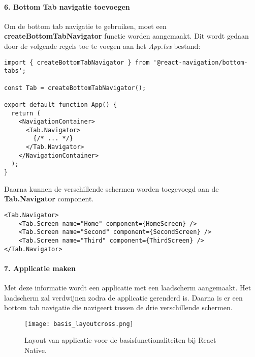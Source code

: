 \paragraph{6. Bottom Tab navigatie toevoegen}
Om de bottom tab navigatie te gebruiken, moet een \textbf{createBottomTabNavigator}
functie worden aangemaakt. Dit wordt gedaan door de volgende regels toe te voegen aan het \textit{App.tsx} bestand:
\begin{verbatim}
import { createBottomTabNavigator } from '@react-navigation/bottom-tabs';

const Tab = createBottomTabNavigator();

export default function App() {
  return (
    <NavigationContainer>
      <Tab.Navigator>
        {/* ... */}
      </Tab.Navigator>
    </NavigationContainer>
  );
}
\end{verbatim}
Daarna kunnen de verschillende schermen worden toegevoegd aan de \textbf{Tab.Navigator} component.
\begin{verbatim}
<Tab.Navigator>
    <Tab.Screen name="Home" component={HomeScreen} />
    <Tab.Screen name="Second" component={SecondScreen} />
    <Tab.Screen name="Third" component={ThirdScreen} />
</Tab.Navigator>
\end{verbatim}

\paragraph{7. Applicatie maken}
Met deze informatie wordt een applicatie met een laadscherm aangemaakt.
Het laadscherm zal verdwijnen zodra de 
applicatie gerenderd is. Daarna is er een bottom tab navigatie die navigeert tussen 
de drie verschillende schermen. 
\begin{figure}[H]
    \centering
    \texttt{[image: basis\_layoutcross.png]}
    \caption{Layout van applicatie voor de basisfunctionaliteiten bij React Native.}
\end{figure}
